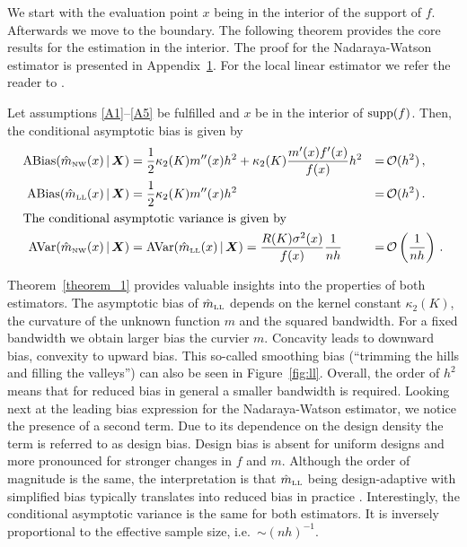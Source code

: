 We start with the evaluation point $x$ being in the interior of the support of $f$.
Afterwards we move to the boundary.
The following theorem provides the core results for the estimation in the interior.
The proof for the Nadaraya-Watson estimator is presented in Appendix~\hyperref[appendix_1]{1}.
For the local linear estimator we refer the reader to \textcite[Section 3.7]{Fan_1996}.
\begin{theorem} \label{theorem_1}
	Let assumptions \ref{A1}--\ref{A5} be fulfilled and $x$ be in the interior of $\operatorname{supp}(f)$.
	Then, the conditional asymptotic bias is given by
	\begin{align}
		\operatorname{ABias} (\hat{m}_{\textup{\tiny NW}}(x) \,|\, \bm{X}) &= \frac{1}{2} \kappa_2(K) m''(x) h^2 + \kappa_2(K) \frac{m'(x)f'(x)}{f(x)} h^2 &=& \operatorname{\mathcal{O}}(h^2) \,, \\
		\operatorname{ABias} (\hat{m}_{\textup{\tiny LL}}(x) \,|\, \bm{X}) &= \frac{1}{2} \kappa_2(K) m''(x) h^2 &=& \operatorname{\mathcal{O}}(h^2) \,. \\
		\intertext{The conditional asymptotic variance is given by}
		\operatorname{AVar} (\hat{m}_{\textup{\tiny NW}}(x) \,|\, \bm{X}) &= \operatorname{AVar} (\hat{m}_{\textup{\tiny LL}}(x) \,|\, \bm{X}) = \frac{R(K) \sigma^2(x)}{f(x)} \frac{1}{nh} &=& \operatorname{\mathcal{O}}\left( \frac{1}{nh} \right) \,.
	\end{align}
\end{theorem} 
Theorem~\ref{theorem_1} provides valuable insights into the properties of both estimators.
The asymptotic bias of $\hat{m}_{\textup{\tiny LL}}$ depends on the kernel constant $\kappa_2(K)$, the curvature of the unknown function $m$ and the squared bandwidth.
For a fixed bandwidth we obtain larger bias the curvier $m$.
Concavity leads to downward bias, convexity to upward bias.
This so-called smoothing bias (\enquote{trimming the hills and filling the valleys}) can also be seen in Figure~\ref{fig:ll}.
Overall, the order of $h^2$ means that for reduced bias in general a smaller bandwidth is required.
Looking next at the leading bias expression for the Nadaraya-Watson estimator, we notice the presence of a second term.
Due to its dependence on the design density the term is referred to as design bias.
Design bias is absent for uniform designs and more pronounced for stronger changes in $f$ and $m$.
Although the order of magnitude is the same, the interpretation is that $\hat{m}_{\textup{\tiny LL}}$ being design-adaptive \parencite{Fan_1992}
with simplified bias typically translates into reduced bias in practice \parencite[678]{Hansen_2022}.
Interestingly, the conditional asymptotic variance is the same for both estimators.
It is inversely proportional to the effective sample size, i.e.\ $\sim (nh)^{-1}$.

